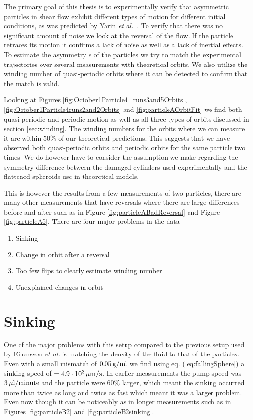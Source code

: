 The primary goal of this thesis is to experimentally verify that asymmetric particles in shear flow exhibit different types of motion for different initial conditions, as was predicted by Yarin \emph{et al.}~\cite{Yarin}. To verify that there was no significant amount of noise we look at the reversal of the flow. If the particle retraces its motion it confirms a lack of noise as well as a lack of inertial effects. To estimate the asymmetry $\epsilon$ of the particles we try to match the experimental trajectories over several measurements with theoretical orbits. We also utilize the winding number of quasi-periodic orbits where it can be detected to confirm that the match is valid.

Looking at Figures \ref{fig:October1Particle4_runs3and5Orbits}, \ref{fig:October1Particle4runs2and2Orbits} and \ref{fig:particleAOrbitFit} we find both quasi-periodic and periodic motion as well as all three types of orbits discussed in section \ref{sec:winding}. The winding numbers for the orbits where we can measure it are within $50\%$ of our theoretical predictions. This suggests that we have observed both quasi-periodic orbits and periodic orbits for the same particle two times. We do however have to consider the assumption we make regarding the symmetry difference between the damaged cylinders used experimentally and the flattened spheroids use in theoretical models.

This is however the results from a few measurements of two particles, there are many other measurements that have reversals where there are large differences before and after such as in Figure \ref{fig:particleABadReversal} and Figure \ref{fig:particleA5}. There are four major problems in the data 

\begin{enumerate}
\item Sinking
\item Change in orbit after a reversal
\item Too few flips to clearly estimate winding number
\item Unexplained changes in orbit 
\end{enumerate}

\section{Sinking}
One of the major problems with this setup compared to the previous setup used by Einarsson \emph{et al.} \cite{JonasExperiment} is matching the density of the fluid to that of the particles. Even with a small mismatch of $\unit[0.05]{g/ml}$ we find using eq. (\ref{eq:fallingSphere}) a sinking speed of $= \unit[4.9\cdot10^3 ]{\mu m/s}$. In earlier measurements the pump speed was $\unit[3]{\mu l/minute}$ and the particle were 60\% larger, which meant the sinking occurred more than twice as long and twice as fast which meant it was a larger problem. Even now though it can be noticeably as in longer measurements such as in Figures \ref{fig:particleB2} and \ref{fig:particleB2sinking}.

